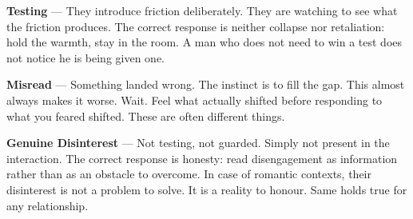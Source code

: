 \textbf{Testing} --- They introduce friction deliberately. They are watching to see what the 
friction produces. The correct response is neither collapse nor retaliation: hold the warmth, 
stay in the room. A man who does not need to win a test does not notice he is being given one.

\textbf{Misread} --- Something landed wrong. The instinct is to fill the gap. This almost 
always makes it worse. Wait. Feel what actually shifted before responding to what you feared 
shifted. These are often different things.

\textbf{Genuine Disinterest} --- Not testing, not guarded. Simply not present in the 
interaction. The correct response is honesty: read disengagement as information rather 
than as an obstacle to overcome. In case of romantic contexts, their disinterest is not a problem to solve. It is a 
reality to honour. Same holds true for any relationship.